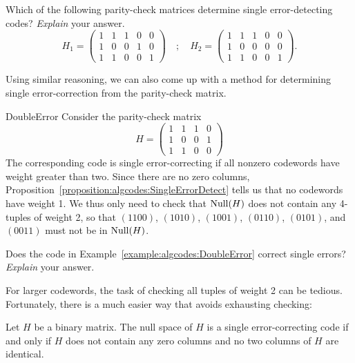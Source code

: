 \begin{exercise}{}
 Which of the following parity-check matrices determine single error-detecting codes? \emph{Explain} your answer.
\[
H_1 =
\left(
\begin{array}{ccccc}
1 & 1 & 1 & 0 & 0 \\
1 & 0 & 0 & 1 & 0 \\
1 & 1 & 0 & 0 & 1
\end{array}
\right)
\quad ; \quad
H_2 =
\left(
\begin{array}{ccccc}
1 & 1 & 1 & 0 & 0 \\
1 & 0 & 0 & 0 & 0 \\
1 & 1 & 0 & 0 & 1
\end{array}
\right).
\]
\end{exercise}
 
Using similar reasoning, we can also come up with a method for determining single error-correction from the parity-check matrix.
 
\begin{example}{DoubleError}
Consider the parity-check matrix
\[
H =
\left(
\begin{array}{cccc}
1 & 1 & 1 & 0 \\
1 & 0 & 0 & 1 \\
1 & 1 & 0 & 0
\end{array}
\right)
\]
The corresponding code is single error-correcting if all nonzero codewords have weight greater than two. Since there are no zero columns, Proposition~\ref{proposition:algcodes:SingleErrorDetect} tells us that no codewords have weight 1. We thus only need to check that  ${\rm Null}(H)$ does not contain any 4-tuples of weight
2, so that $(1100)$, $(1010)$, $(1001)$, $(0110)$, $(0101)$, and
$(0011)$ must not be in ${\rm Null}(H)$.
\end{example}

\begin{exercise}{}
Does the code in Example~\ref{example:algcodes:DoubleError} correct single errors? \emph{Explain} your answer.
\end{exercise}

For larger codewords, the task of checking all tuples of weight 2 can be tedious. Fortunately, there is a much easier way that avoids exhausting checking:
 
\begin{prop}{}
Let $H$ be a binary matrix. The null space of $H$ is a single
error-correcting code if and only if $H$ does not contain any zero
columns and no two columns of $H$ are identical.
\end{prop}
 
